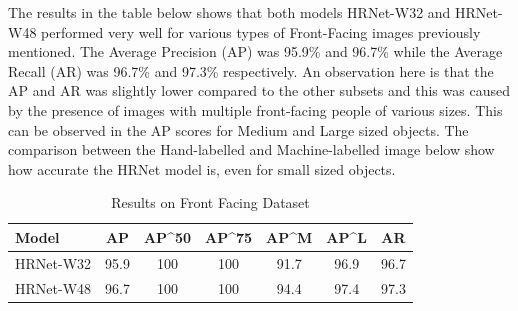 \documentclass[a4paper,12pt]{article}
\begin{document}
The results in the table below shows that both models HRNet-W32 and HRNet-W48 performed very well for various types of Front-Facing images previously mentioned. The Average Precision (AP) was 95.9\% and 96.7\% while the Average Recall (AR) was 96.7\% and 97.3\% respectively. An observation here is that the AP and AR was slightly lower compared to the other subsets and this was caused by the presence of images with multiple front-facing people of various sizes. This can be observed in the AP scores for Medium and Large sized objects. The comparison between the Hand-labelled and Machine-labelled image below show how accurate the HRNet model is, even for small sized objects.\\

    \begin{table}[h]
    \begin{center}
    \begin{tabular}{ l | c | c | c | c | c | c}
    Model & AP & AP^{50} & AP^{75} & AP^{M} & AP^{L} & AR \\
    \hline \hline
    HRNet-W32 & 95.9 & 100 & 100 & 91.7 & 96.9 & 96.7 \\
    HRNet-W48 & 96.7 & 100 & 100 & 94.4 & 97.4 & 97.3 \\
    \end{tabular}
    \caption{Results on Front Facing Dataset}
    \label{tab:caption}
    \end{center}
    \end{table}
    
\end{document}
